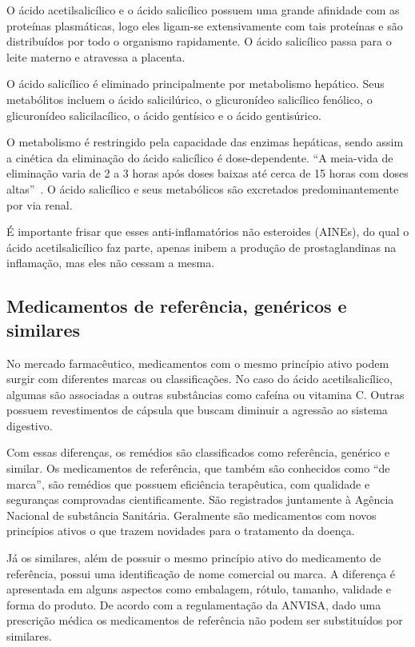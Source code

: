 O ácido acetilsalicílico e o ácido salicílico possuem uma grande afinidade com as proteínas
plasmáticas, logo eles ligam-se extensivamente com tais proteínas e são distribuídos por todo o
organismo rapidamente.  O ácido salicílico passa para o leite materno e atravessa a placenta.

O ácido salicílico é eliminado principalmente por metabolismo hepático. Seus metabólitos incluem o
ácido salicilúrico, o glicuronídeo salicílico fenólico, o glicuronídeo salicilacílico, o ácido
gentísico e o ácido gentisúrico.

O metabolismo é restringido pela capacidade das enzimas hepáticas, sendo assim a cinética da
eliminação do ácido salicílico é dose-dependente. “A meia-vida de eliminação varia de 2 a 3 horas
após doses baixas até cerca de 15 horas com doses altas”~\cite{bulaaspirina}. O ácido salicílico e
seus metabólicos são excretados predominantemente por via renal. 

É importante frisar que esses anti-inflamatórios não esteroides (AINEs), do qual o ácido
acetilsalicílico faz parte, apenas inibem a produção de prostaglandinas na inflamação, mas eles não
cessam a mesma.

\subsection{Medicamentos de referência, genéricos e similares}\label{refgensim}

No mercado farmacêutico, medicamentos com o mesmo princípio ativo podem surgir com diferentes marcas
ou classificações. No caso do ácido acetilsalicílico, algumas são associadas a outras substâncias
como cafeína ou vitamina C. Outras possuem revestimentos de cápsula que buscam diminuir a agressão ao
sistema digestivo.~\cite{prade2006}

Com essas diferenças, os remédios são classificados como referência, genérico e similar. Os
medicamentos de referência, que também são conhecidos como “de marca”, são remédios que possuem
eficiência terapêutica, com qualidade e seguranças comprovadas cientificamente. São registrados
juntamente à Agência Nacional de substância Sanitária. Geralmente são medicamentos com novos
princípios ativos o que trazem novidades para o tratamento da doença.

Já os similares, além de possuir o mesmo princípio ativo do medicamento de referência, possui uma
identificação de nome comercial ou marca. A diferença é apresentada em alguns aspectos como
embalagem, rótulo, tamanho, validade e forma do produto. De acordo com a regulamentação da ANVISA,
dado uma prescrição médica os medicamentos de referência não podem ser substituídos por similares.

